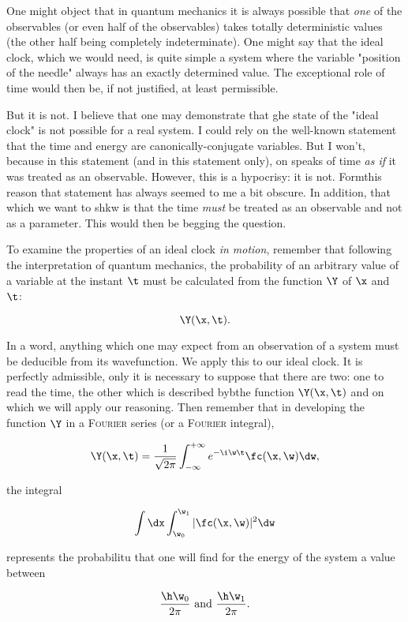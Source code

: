 \documentclass{article}
\newcommand{\uequ}[1]{
\begin{equation*}
#1
\end{equation*}
}
\newcommand{\const}[1]{#1}
\newcommand{\inv}[1]{\frac{1}{#1}}
\renewcommand{\it}[1]{\textit{#1}}
\renewcommand{\sc}[1]{\textsc{#1}}
\newcommand{\intXY}[2]{\int_{#1}^{#2}}
\renewcommand{\exp}[1]{\const{e}^{#1}}
\begin{document}
One might object that in quantum mechanics it is always possible that \it{one} of the observables (or even half of the observables) takes totally deterministic values (the other half being completely indeterminate). One might say that the ideal clock, which we would need, is quite simple a system where the variable "position of the needle" always has an exactly determined value. The exceptional role of time would then be, if not justified, at least permissible.

But it is not. I believe that one may demonstrate that ghe state of the "ideal clock" is not possible for a real system. I could rely on the well-known statement that the time and energy are canonically-conjugate variables. But I won't, because in this statement (and in this statement only), on speaks of time \it{as if} it was treated as an observable. However, this is a hypocrisy: it is not. Formthis reason that statement has always seemed to me a bit obscure. In addition, that which we want to shkw is that the time \it{must} be treated as an observable and not as a parameter. This would then be begging the question.

To examine the properties of an ideal clock \it{in motion}, remember that following the interpretation of quantum mechanics, the probability of an arbitrary value of a variable at the instant $\t$ must be calculated from the function $\Y$ of $\x$ and $\t$:
\uequ{
\Y(\x, \t).
}
In a word, anything which one may expect from an observation of a system must be deducible from its wavefunction. We apply this to our ideal clock. It is perfectly admissible, only it is necessary to suppose that there are two: one to read the time, the other which is described bybthe function $\Y(\x, \t)$ and on which we will apply our reasoning. Then remember that in developing the function $\Y$ in a \sc{Fourier} series (or a \sc{Fourier} integral),
\uequ{
\Y(\x, \t) = \inv{\sqrt{2\pi}}\intXY{-\infty}{+\infty}\exp{-\i\w\t}\fc(\x, \w)\dw,
}
the integral
\uequ{
\int\dx\intXY{\w_0}{\w_1}|\fc(\x, \w)|^2 \dw
}
represents the probabilitu that one will find for the energy of the system a value between
\uequ{
\frac{\h\w_0}{2\pi} \text{ and } \frac{\h\w_1}{2\pi}.
}
\end{document}
